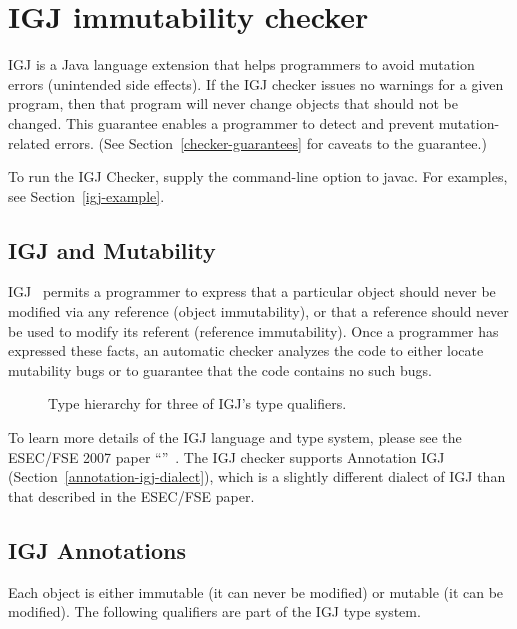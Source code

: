 \htmlhr
\chapter{IGJ immutability checker\label{igj-checker}}

IGJ is a Java language extension that helps programmers to avoid mutation errors
(unintended side effects).
If the IGJ checker issues no warnings for a given program, then that program
will never change objects that should not be changed.  This guarantee
enables a programmer to detect and prevent mutation-related errors.
(See Section~\ref{checker-guarantees} for caveats to the guarantee.)

To run the IGJ Checker, supply the 
command-line option to javac.  For examples, see Section~\ref{igj-example}.


\section{IGJ and Mutability\label{igj-and-mutability}}

IGJ~\cite{ZibinPAAKE2007} permits a
programmer to express that a particular object should never be modified via any
reference (object immutability), or that a reference should never be used to
modify its referent (reference immutability). Once a programmer has expressed
these facts, an automatic checker analyzes the code to either locate mutability
bugs or to guarantee that the code contains no such bugs.

\begin{figure}
\caption{Type hierarchy for three of IGJ's type qualifiers.}
\label{fig:igj-hierarchy}
\end{figure}

To learn more details of the IGJ language and type system, please see the
ESEC/FSE 2007 paper ``''~\cite{ZibinPAAKE2007}.
The IGJ checker supports Annotation IGJ (Section~\ref{annotation-igj-dialect}),
which is a slightly different dialect
of IGJ than that described in the ESEC/FSE paper.


\section{IGJ Annotations\label{igj-annotations}}

Each object is either immutable (it can never be modified) or mutable (it
can be modified).  The following qualifiers are part of the IGJ type system.


